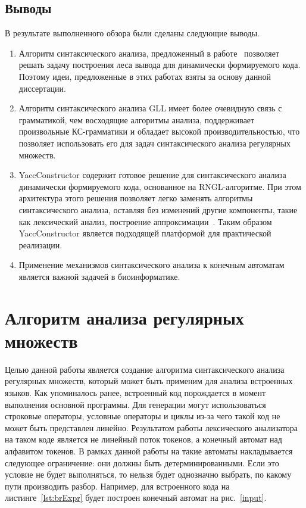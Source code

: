 \documentclass[14pt]{matmex-diploma}
\begin{document}
\subsection{Выводы}
В результате выполненного обзора были сделаны следующие выводы.
\begin{enumerate}
\item Алгоритм синтаксического анализа, предложенный в работе~\cite{RelaxedARNGLR} позволяет решать задачу построения леса вывода для динамически формируемого кода. Поэтому идеи, предложенные в этих работах взяты за основу данной диссертации.
\item Алгоритм синтаксического анализа GLL имеет более очевидную связь с грамматикой, чем восходящие алгоритмы анализа, поддерживает произвольные КС-грамматики и обладает высокой производительностью, что позволяет использовать его для задач синтаксического анализа регулярных множеств.
\item YaccConstructor содержит готовое решение для синтаксического анализа динамически формируемого кода, основанное на RNGL-алгоритме. При этом архитектура этого решения позволяет легко заменять алгоритмы синтаксического анализа, оставляя без изменений другие компоненты, такие как лексический анализ, построение аппроксимации~\cite{SELforIDE}. Таким образом YaccConstructor является подходящей платформой для практической реализации.
\item Применение механизмов синтаксического анализа к конечным автоматам является важной задачей в биоинформатике.
\end{enumerate}

\section{Алгоритм анализа регулярных множеств}
Целью данной работы является создание алгоритма синтаксического анализа регулярных множеств, который может быть применим для анализа встроенных языков. Как упоминалось ранее, встроенный код порождается в момент выполнения основной программы. Для генерации могут использоваться строковые операторы, условные операторы и циклы из-за чего такой код не может быть представлен линейно. Результатом работы лексического анализатора на таком коде является не линейный поток токенов, а конечный автомат над алфавитом токенов. В рамках данной работы на такие автоматы накладывается следующее ограничение: они должны быть детерминированными. Если это условие не будет выполняться, то нельзя будет однозначно выбрать, по какому пути производить разбор. Например, для встроенного кода на листинге~\ref{lst:brExpr} будет построен конечный автомат на рис.~\ref{input}.
\end{document}
